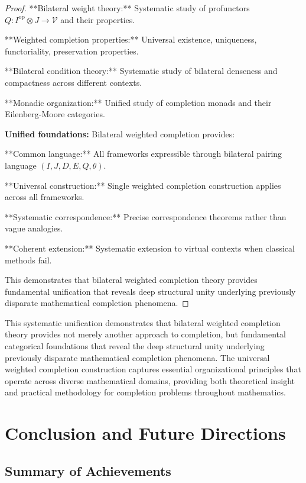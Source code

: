 \documentclass[11pt]{article}
\theoremstyle{plain}
\theoremstyle{definition}
\theoremstyle{remark}
\newcommand{\V}{\mathcal{V}}
\newcommand{\op}{\mathrm{op}}
\begin{document}
\begin{proof}
**Bilateral weight theory:** Systematic study of profunctors $Q : I^{\op} \otimes J \to \V$ and their properties.

**Weighted completion properties:** Universal existence, uniqueness, functoriality, preservation properties.

**Bilateral condition theory:** Systematic study of bilateral denseness and compactness across different contexts.

**Monadic organization:** Unified study of completion monads and their Eilenberg-Moore categories.

\textbf{Unified foundations:} Bilateral weighted completion provides:

**Common language:** All frameworks expressible through bilateral pairing language $(I, J, D, E, Q, \theta)$.

**Universal construction:** Single weighted completion construction applies across all frameworks.

**Systematic correspondence:** Precise correspondence theorems rather than vague analogies.

**Coherent extension:** Systematic extension to virtual contexts when classical methods fail.

This demonstrates that bilateral weighted completion theory provides fundamental unification that reveals deep structural unity underlying previously disparate mathematical completion phenomena.
\end{proof}

This systematic unification demonstrates that bilateral weighted completion theory provides not merely another approach to completion, but fundamental categorical foundations that reveal the deep structural unity underlying previously disparate mathematical completion phenomena. The universal weighted completion construction captures essential organizational principles that operate across diverse mathematical domains, providing both theoretical insight and practical methodology for completion problems throughout mathematics.

\section{Conclusion and Future Directions}

\subsection{Summary of Achievements}
\end{document}
